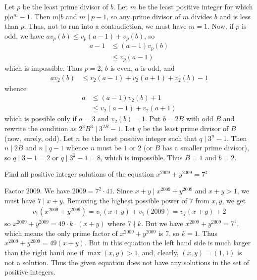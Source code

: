 \documentclass[main.tex]{subfile}
\begin{document}
    \begin{solution}
        Let $p$ be the least prime divisor of $b$. Let $m$ be the least positive integer for which $p|a^m-1$. Then $m|b$ and $m\mid p-1$, so any prime divisor of $m$ divides $b$ and is less than $p$. Thus, not to run into a contradiction, we must have $m=1$. Now, if $p$ is odd, we have $av_p(b)\le v_p(a-1)+v_p(b)$, so
        	\begin{align*}
	        	a-1
	        		& \le (a-1)v_p(b)\\
	        		& \le v_p(a-1)
        	\end{align*}
        which is impossible. Thus $p=2$, $b$ is even, $a$ is odd, and
        	\begin{align*}
        		av_2(b)
        			& \le v_2(a-1)+v_2(a+1)+v_2(b)-1
        	\end{align*}
        whence
        	\begin{align*}
        		a
        			& \le (a-1)v_2(b)+1\\
        			& \le v_2(a-1)+v_2(a+1)
        	\end{align*}
        which is possible only if $a=3$ and $v_2(b)=1$. Put $b=2B$ with odd $B$ and rewrite the condition as $2^3B^3\mid 3^{2B}-1$. Let $q$ be the least prime divisor of $B$ (now, surely, odd). Let $n$ be the least positive integer such that $q\mid 3^n-1$. Then $n\mid 2B$ and $n\mid q-1$ whence $n$ must be $1$ or $2$ (or $B$ has a smaller prime divisor), so $q\mid 3-1=2$ or $q\mid 3^2-1=8$, which is impossible. Thus $B=1$ and $b=2$.
    \end{solution}

    \begin{problem}
        Find all positive integer solutions of the equation $ x^{2009} + y^{2009} = 7^z$
    \end{problem}

    \begin{solution}
        Factor 2009. We have $2009 = 7^2\cdot 41$. Since $x+y\mid x^{2009}+y^{2009}$ and $x+y>1$, we must have $7 \mid x+ y$. Removing the highest possible power of $7$ from $x, y$, we get
        	\begin{align*}
        		v_7(x^{2009} + y^{2009}) = v_7(x + y)+ v_7(2009) = v_7(x +y) +2
        	\end{align*}
        so $x^{2009} + y^{2009} = 49\cdot k\cdot (x + y)$ where $7\nmid k$. But we have $x^{2009} + y^{2009} = 7^z$, which means the only prime factor of $x^{2009} + y^{2009}$ is $7$, so $k=1$. Thus $x^{2009} + y^{2009} = 49(x + y)$.  But in this equation the left hand side is much larger than the right hand one if $\max(x, y) > 1$, and, clearly, $(x, y) = (1, 1)$ is not a solution. Thus the given equation does not have any solutions in the set of positive integers.
    \end{solution}
\end{document}
